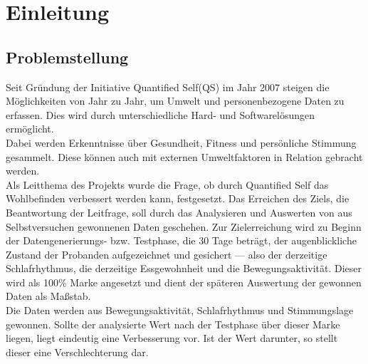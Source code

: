 
\chapter{Einleitung}
\label{ch:Einleitung}

\section{Problemstellung}
\label{ch:Einleitung:sec:Problemstellung}

Seit Gründung der Initiative Quantified Self(QS)\cite{web:QS} im Jahr 2007\cite{web:QSJahr} steigen die Möglichkeiten von Jahr zu Jahr, um Umwelt und personenbezogene Daten zu erfassen. \cite{web:Tracking} 
Dies wird durch unterschiedliche Hard- und Softwarelösungen ermöglicht. \\
Dabei werden Erkenntnisse über Gesundheit, Fitness und persönliche Stimmung gesammelt.
Diese können auch mit externen Umweltfaktoren in Relation gebracht werden. \\
Als Leitthema des Projekts wurde die Frage, ob durch Quantified Self das Wohlbefinden verbessert werden kann, festgesetzt. 
Das Erreichen des Ziels, die Beantwortung der Leitfrage, soll durch das Analysieren und Auswerten von aus Selbstversuchen gewonnenen Daten geschehen.
Zur Zielerreichung wird zu Beginn der Datengenerierungs- bzw. Testphase, die 30 Tage beträgt, der augenblickliche Zustand der Probanden aufgezeichnet und gesichert –– also der derzeitige Schlafrhythmus, die derzeitige Essgewohnheit und die Bewegungsaktivität. 
Dieser wird als 100\% Marke angesetzt und dient der späteren Auswertung der gewonnen Daten als Maßstab. \\
Die Daten werden aus Bewegungsaktivität, Schlafrhythmus und Stimmungslage gewonnen.
Sollte der analysierte Wert nach der Testphase über dieser Marke liegen, liegt eindeutig eine Verbesserung vor. 
Ist der Wert darunter, so stellt dieser eine Verschlechterung dar. \\
